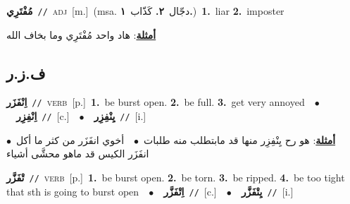 \documentclass[10pt,a4paper,twoside]{article} %
\begin{document}
\begin{multicols}{2}
{\setlength\topsep{0pt}\textbf{\foreignlanguage{arabic}{مُفْتَرِي}}\ {\color{gray}\texttt{//}\color{black}}\ \textsc{adj}\ [m.]\ \color{gray}(msa. \foreignlanguage{arabic}{دجّال}~\foreignlanguage{arabic}{\textbf{٢.}}  \foreignlanguage{arabic}{كَذّاب}~\foreignlanguage{arabic}{\textbf{١.}})\color{black}\ \textbf{1.}~liar  \textbf{2.}~imposter\  \begin{flushright}\color{gray}\foreignlanguage{arabic}{\textbf{\underline{\foreignlanguage{arabic}{أمثلة}}}: هاد واحد مُفْتَرِي وما بخاف الله}\end{flushright}\color{black}} \vspace{2mm}

\vspace{-3mm}
\subsection*{\color{blue}\foreignlanguage{arabic}{ف.ز.ر}\color{blue}{}} 

{\setlength\topsep{0pt}\textbf{\foreignlanguage{arabic}{اِنْفَزَر}}\ {\color{gray}\texttt{//}\color{black}}\ \textsc{verb}\ [p.]\ \textbf{1.}~be burst open.  \textbf{2.}~be full.  \textbf{3.}~get very annoyed\ \ $\bullet$\ \ \setlength\topsep{0pt}\textbf{\foreignlanguage{arabic}{اِنْفِزِر}}\ {\color{gray}\texttt{//}\color{black}}\ [c.]\ \ $\bullet$\ \ \setlength\topsep{0pt}\textbf{\foreignlanguage{arabic}{يِنْفِزِر}}\ {\color{gray}\texttt{//}\color{black}}\ [i.]\  \begin{flushright}\color{gray}\foreignlanguage{arabic}{\textbf{\underline{\foreignlanguage{arabic}{أمثلة}}}: هو رح يِنْفِزِر منها قد مابتطلب منه طلبات\ $\bullet$\ \  أخوي انفَزَر من كثر ما أكل\ $\bullet$\ \  انفَزَر الكيس قد ماهو محشَّى أشياء}\end{flushright}\color{black}} \vspace{2mm}

{\setlength\topsep{0pt}\textbf{\foreignlanguage{arabic}{تْفَزَّر}}\ {\color{gray}\texttt{//}\color{black}}\ \textsc{verb}\ [p.]\ \textbf{1.}~be burst open.  \textbf{2.}~be torn.  \textbf{3.}~be ripped.  \textbf{4.}~be too tight that sth is going to burst open\ \ $\bullet$\ \ \setlength\topsep{0pt}\textbf{\foreignlanguage{arabic}{اِتْفَزَّر}}\ {\color{gray}\texttt{//}\color{black}}\ [c.]\ \ $\bullet$\ \ \setlength\topsep{0pt}\textbf{\foreignlanguage{arabic}{يِتْفَزَّر}}\ {\color{gray}\texttt{//}\color{black}}\ [i.]\ } \vspace{2mm}


\end{multicols}
\end{document}
